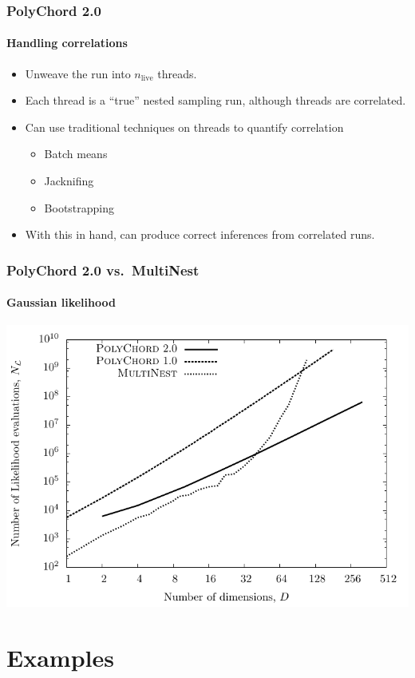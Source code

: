 \documentclass[%
]{beamer}
\newcommand{\nlive}{n_\mathrm{live}}
\begin{document}
\begin{frame}
  \frametitle{PolyChord 2.0}
  \framesubtitle{Handling correlations}

  \begin{itemize}
    \pause\item Unweave the run into $\nlive$ threads.
    \pause\item Each thread is a ``true'' nested sampling run, although threads are correlated.
    \pause\item Can use traditional techniques on threads to quantify correlation 
      \begin{itemize}
        \pause\item Batch means
        \item Jacknifing
        \item Bootstrapping
      \end{itemize}
    \pause\item With this in hand, can produce correct inferences from correlated runs.
  \end{itemize}

\end{frame}

\begin{frame}
  \frametitle{PolyChord 2.0 vs.\ MultiNest}
  \framesubtitle{Gaussian likelihood}
  \includegraphics[width=\textwidth]{figures/polychord_vs_multinest_1.pdf}
\end{frame}

\section{Examples}
\end{document}
